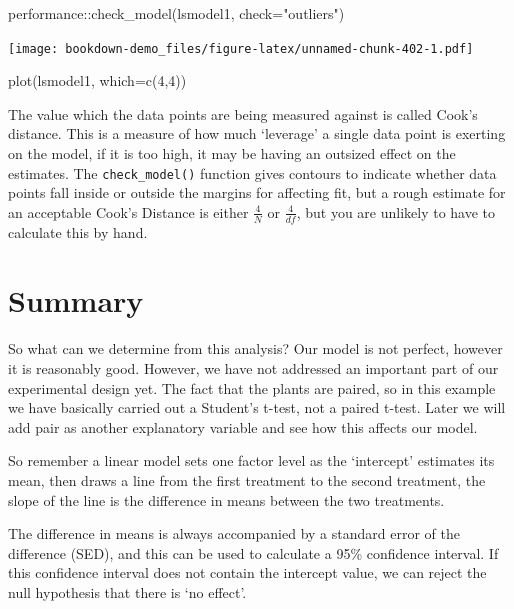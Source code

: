 \documentclass[
]{book}
\newenvironment{Shaded}{\begin{snugshade}}{\end{snugshade}}
\newcommand{\AttributeTok}[1]{\textcolor[rgb]{0.77,0.63,0.00}{#1}}
\newcommand{\DecValTok}[1]{\textcolor[rgb]{0.00,0.00,0.81}{#1}}
\newcommand{\FunctionTok}[1]{\textcolor[rgb]{0.00,0.00,0.00}{#1}}
\newcommand{\NormalTok}[1]{#1}
\newcommand{\SpecialCharTok}[1]{\textcolor[rgb]{0.00,0.00,0.00}{#1}}
\newcommand{\StringTok}[1]{\textcolor[rgb]{0.31,0.60,0.02}{#1}}
\begin{document}
\begin{Shaded}
\begin{Highlighting}[]
\NormalTok{performance}\SpecialCharTok{::}\FunctionTok{check\_model}\NormalTok{(lsmodel1, }\AttributeTok{check=}\StringTok{"outliers"}\NormalTok{)}
\end{Highlighting}
\end{Shaded}

\texttt{[image: bookdown-demo\_files/figure-latex/unnamed-chunk-402-1.pdf]}

\begin{Shaded}
\begin{Highlighting}[]
\FunctionTok{plot}\NormalTok{(lsmodel1, }\AttributeTok{which=}\FunctionTok{c}\NormalTok{(}\DecValTok{4}\NormalTok{,}\DecValTok{4}\NormalTok{))}
\end{Highlighting}
\end{Shaded}

The value which the data points are being measured against is called Cook's distance. This is a measure of how much `leverage' a single data point is exerting on the model, if it is too high, it may be having an outsized effect on the estimates. The \texttt{check\_model()} function gives contours to indicate whether data points fall inside or outside the margins for affecting fit, but a rough estimate for an acceptable Cook's Distance is either \(\frac{4}{N}\) or \(\frac{4}{df}\), but you are unlikely to have to calculate this by hand.

\hypertarget{summary-2}{%
\section{Summary}\label{summary-2}}

So what can we determine from this analysis? Our model is not perfect, however it is reasonably good. However, we have not addressed an important part of our experimental design yet. The fact that the plants are paired, so in this example we have basically carried out a Student's t-test, not a paired t-test. Later we will add pair as another explanatory variable and see how this affects our model.

So remember a linear model sets one factor level as the `intercept' estimates its mean, then draws a line from the first treatment to the second treatment, the slope of the line is the difference in means between the two treatments.

The difference in means is always accompanied by a standard error of the difference (SED), and this can be used to calculate a 95\% confidence interval. If this confidence interval does not contain the intercept value, we can reject the null hypothesis that there is `no effect'.
\end{document}
